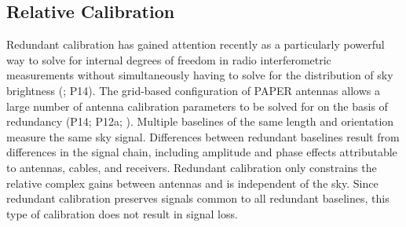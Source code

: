 \documentclass[twocolumn,numberedappendix]{emulateapj} \shorttitle{New Limits on the 21 cm Power Spectrum at $z=8.4$}
\begin{document}
\subsection{Relative Calibration}\label{sec:relcal}
%         
%

Redundant calibration has gained attention recently as a particularly powerful
way to solve for internal degrees of freedom in radio interferometric measurements without simultaneously
having to solve for the distribution of sky brightness 
(\citealt{wieringa1992,liu_et_al2010,noorishad_et_al2012,marthi_chengalur2014,zheng_et_al2014}; P14).
The grid-based configuration of PAPER antennas allows a large number of antenna
calibration parameters to be solved for on the basis of redundancy (P14; P12a; 
\citealt{zheng_et_al2014}).  Multiple baselines of the same length and
orientation measure the same sky signal. Differences between redundant
baselines result from differences in the signal chain, including amplitude and
phase effects attributable to antennas, cables, and receivers.  Redundant
calibration only constrains the relative complex gains between antennas and is
independent of the sky. Since redundant calibration preserves signals common to
all redundant baselines, this type of calibration does not result in signal loss.
\end{document}
